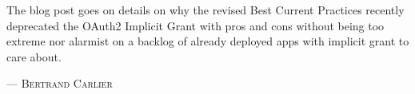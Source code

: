 The blog post goes on details on why the revised Best Current Practices recently deprecated the OAuth2 Implicit Grant with pros and cons without being too extreme nor alarmist on a backlog of already deployed apps with implicit grant to care about.
\setlength{\parindent}{0cm}\par\textsc{ --- Bertrand Carlier }\par\vspace{12pt}\setlength{\parindent}{15pt}
